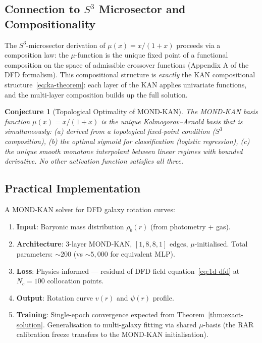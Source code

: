 \documentclass[11pt]{article}
\newtheorem{conjecture}[theorem]{Conjecture}
\theoremstyle{definition}
\theoremstyle{remark}
\begin{document}
\subsection{Connection to $S^3$ Microsector and Compositionality}
\label{sec:s3-compositionality}

The $S^3$-microsector derivation of $\mu(x) = x/(1+x)$ proceeds via a
composition law: the $\mu$-function is the unique fixed point of a
functional composition on the space of admissible crossover functions
(Appendix A of the DFD formalism). This compositional structure is
\emph{exactly} the KAN compositional structure~\eqref{eq:ka-theorem}:
each layer of the KAN applies univariate functions, and the multi-layer
composition builds up the full solution.

\begin{conjecture}[Topological Optimality of MOND-KAN]
\label{conj:topological-optimality}
The MOND-KAN basis function $\mu(x) = x/(1+x)$ is the unique
Kolmogorov--Arnold basis that is simultaneously:
(a) derived from a topological fixed-point condition ($S^3$ composition),
(b) the optimal sigmoid for classification (logistic regression),
(c) the unique smooth monotone interpolant between linear regimes with
bounded derivative. No other activation function satisfies all three.
\end{conjecture}

\subsection{Practical Implementation}
\label{sec:mond-kan-implementation}

A MOND-KAN solver for DFD galaxy rotation curves:
\begin{enumerate}
\item \textbf{Input}: Baryonic mass distribution $\rho_b(r)$ (from photometry + gas).
\item \textbf{Architecture}: 3-layer MOND-KAN, $[1, 8, 8, 1]$ edges,
  $\mu$-initialised. Total parameters: $\sim 200$ (vs $\sim 5{,}000$ for
  equivalent MLP).
\item \textbf{Loss}: Physics-informed --- residual of DFD field
  equation~\eqref{eq:1d-dfd} at $N_c = 100$ collocation points.
\item \textbf{Output}: Rotation curve $v(r)$ and $\psi(r)$ profile.
\item \textbf{Training}: Single-epoch convergence expected from
  Theorem~\ref{thm:exact-solution}. Generalisation to multi-galaxy
  fitting via shared $\mu$-basis (the RAR calibration freeze transfers
  to the MOND-KAN initialisation).
\end{enumerate}
\end{document}
